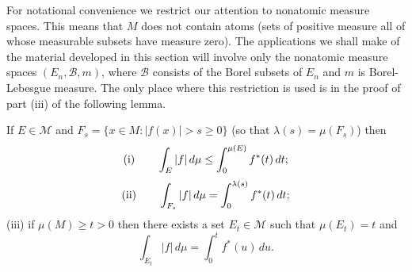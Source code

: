 For notational convenience we restrict our attention to nonatomic measure
spaces. This means that $M$ does not contain atoms (sets of positive measure
all of whose measurable subsets have measure zero). The applications we shall
make of the material developed in this section will involve only the nonatomic
measure spaces $(E_{n}, \mathcal{B}, m)$, where $\mathcal{B}$ consists of the
Borel subsets of $E_{n}$ and $m$ is Borel-Lebesgue measure. The only place
where this restriction is used is in the proof of part (iii) of the following
lemma.

\begin{lemma}\label{lem:c5-3-17}
If $E \in \mathcal{M}$ and
$F_{s} = \{x \in M : |f(x)| > s \geq 0\}$ (so that $\lambda(s) = \mu(F_{s})$)
then
\[
\textup{(i)}\qquad \int_{E}|f|\,d\mu\leq\int_{0}^{\mu(E)}f^{*}(t)\,dt;
\]
\[
\textup{(ii)}\qquad \int_{F_{s}}|f|\,d\mu=\int_{0}^{\lambda(s)}f^{*}(t)\,dt;
\]
\textup{(iii)} if $\mu(M) \geq t > 0$ then there exists a set
$E_{t} \in \mathcal{M}$ such that $\mu(E_{t}) = t$ and
\[
\int_{E_{t}}|f|\,d\mu=\int_{0}^{t}f^{*}(u)\,du.
\]
\end{lemma}

